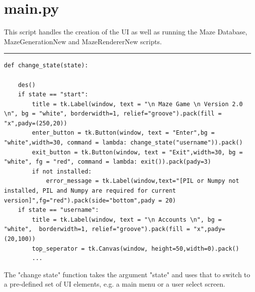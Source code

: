 \documentclass{article}
\begin{document}
\section{main.py}
This script handles the creation of the UI as well as running the Maze Database, MazeGenerationNew and 
MazeRendererNew scripts.

\textcolor[RGB]{220,220,220}{\rule{\linewidth}{0.2pt}}
\begin{lstlisting}
def change_state(state):      

    des()
    if state == "start":    
        title = tk.Label(window, text = "\n Maze Game \n Version 2.0 \n", bg = "white", borderwidth=1, relief="groove").pack(fill = "x",pady=(250,20))
        enter_button = tk.Button(window, text = "Enter",bg = "white",width=30, command = lambda: change_state("username")).pack()
        exit_button = tk.Button(window, text = "Exit",width=30, bg = "white", fg = "red", command = lambda: exit()).pack(pady=3)
        if not installed:
            error_message = tk.Label(window,text="[PIL or Numpy not installed, PIL and Numpy are required for current version]",fg="red").pack(side="bottom",pady = 20)
    if state == "username": 
        title = tk.Label(window, text = "\n Accounts \n", bg = "white",  borderwidth=1, relief="groove").pack(fill = "x",pady=(20,100))
        top_seperator = tk.Canvas(window, height=50,width=0).pack()
        ...
\end{lstlisting}
The "change state" function takes the argument "state" and uses that to switch to a pre-defined set of UI elements, e.g. a main menu or a user select screen.
\end{document}
